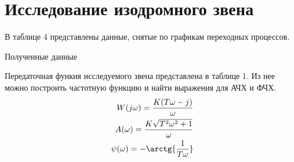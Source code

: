 \documentclass[a4paper, 11pt]{article}
\begin{document}
\newpage
\section{Исследование изодромного звена}
В таблице 4 представлены данные, снятые по графикам переходных процессов.
\begin{table}[h!]
    \centering
    \begin{threeparttable}
        \caption{Полученные данные}
    \end{threeparttable}
\end{table}

Передаточная функия исследуемого звена представлена в таблице 1. Из нее можно построить частотную функцию и найти выражения для АЧХ и ФЧХ.
\begin{align}
    W(j\omega) = \frac{K(T\omega - j)}{\omega} \\
    A(\omega) = \frac{K\sqrt{T^2\omega^2 + 1}}{\omega} \\
    \psi(\omega) = -\arctg{\frac{1}{T\omega}}
\end{align}
\end{document}
